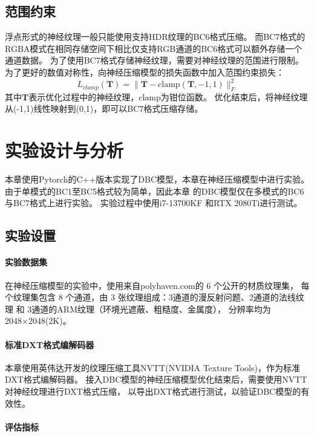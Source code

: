 \subsection{范围约束}
\label{范围约束}

浮点形式的神经纹理一般只能使用支持HDR纹理的BC6格式压缩。
而BC7格式的RGBA模式在相同存储空间下相比仅支持RGB通道的BC6格式可以额外存储一个通道数据。
为了使用BC7格式存储神经纹理，需要对神经纹理的范围进行限制。
为了更好的数值对称性，向神经压缩模型的损失函数中加入范围约束损失：
\begin{equation}
L_{clamp}(\mathbf{T})=\|\mathbf{T}-\text{clamp}(\mathbf{T},-1,1)\|_F^2
\end{equation}
其中$\mathbf{T}$表示优化过程中的神经纹理，$\text{clamp}$为钳位函数。
优化结束后，将神经纹理从(-1,1)线性映射到(0,1)，即可以BC7格式压缩存储。


\section{实验设计与分析}

本章使用Pytorch的C++版本实现了DBC模型，本章在神经压缩模型中进行实验。
由于单模式的BC1至BC5格式较为简单，因此本章
的DBC模型仅在多模式的BC6与BC7格式上进行实验。
实验过程中使用i7-13700KF
和RTX 2080Ti进行测试。

\subsection{实验设置}

\paragraph{实验数据集}

在神经压缩模型的实验中，使用来自polyhaven.com\cite{PolyHaven}的 6 个公开的材质纹理集，
每个纹理集包含 8 个通道，由 3 张纹理组成：3通道的漫反射问题、2通道的法线纹理 和 3通道的ARM纹理（环境光遮蔽、粗糙度、金属度），
分辨率均为2048×2048(2K)。

\paragraph{标准DXT格式编解码器}

本章使用英伟达开发的纹理压缩工具NVTT(NVIDIA Texture Tools)，作为标准DXT格式编解码器。
接入DBC模型的神经压缩模型优化结束后，需要使用NVTT对神经纹理进行DXT格式压缩，
以导出DXT格式进行测试，以验证DBC模型的有效性。

\paragraph{评估指标}

